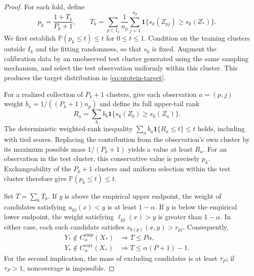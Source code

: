 \documentclass[11pt]{article}
\begin{document}
\begin{proof}
For each fold, define
\begin{equation}
 p_k=\frac{1+T_k}{P_k+1},\qquad
 T_k=\sum_{p\in I_k}\frac1{n_p}\sum_{j=1}^{n_p}
       \mathbf1\{s_k(Z_{pj})\geq s_k(Z_*)\}.
 \label{eq:hierarchical-fold-pvalues}
\end{equation}
We first establish $\mathbb P(p_k\leq t)\leq t$ for $0\leq t\leq1$. Condition on the training clusters outside $I_k$ and the fitting randomness, so that $s_k$ is fixed. Augment the calibration data by an unobserved test cluster generated using the same sampling mechanism, and select the test observation uniformly within this cluster. This produces the target distribution in \eqref{eq:protein-target}.

For a realized collection of $P_k+1$ clusters, give each observation $a=(p,j)$ weight $b_a=1/((P_k+1)n_p)$ and define its full upper-tail rank
\[
 R_a=\sum_b b_b\mathbf1\{s_k(Z_b)\geq s_k(Z_a)\}.
\]
The deterministic weighted-rank inequality
$\sum_ab_a\mathbf1\{R_a\leq t\}\leq t$
holds, including with tied scores. Replacing the contribution from the observation's own cluster by its maximum possible mass $1/(P_k+1)$ yields a value at least $R_a$. For an observation in the test cluster, this conservative value is precisely $p_k$. Exchangeability of the $P_k+1$ clusters and uniform selection within the test cluster therefore give $\mathbb P(p_k\leq t)\leq t$.

Set $T=\sum_kT_k$. If $y$ is above the empirical upper endpoint, the weight of candidates satisfying $u_{pj}(x)<y$ is at least $1-\alpha$. If $y$ is below the empirical lower endpoint, the weight satisfying $\ell_{pj}(x)>y$ is greater than $1-\alpha$. In either case, each such candidate satisfies $s_{k(p)}(x,y)>r_{pj}$. Consequently,
\begin{align}
 Y_*\notin C_{\alpha}^{\mathrm{emp}}(X_*)
 &\Longrightarrow T\leq P\alpha,\nonumber\\
 Y_*\notin C_{\alpha}^{\mathrm{corr}}(X_*)
 &\Longrightarrow T\leq\alpha(P+1)-1.
 \label{eq:endpoint-rank-implications}
\end{align}
For the second implication, the mass of excluding candidates is at least $\tau_P$; if $\tau_P>1$, noncoverage is impossible.


\end{proof}
\end{document}
